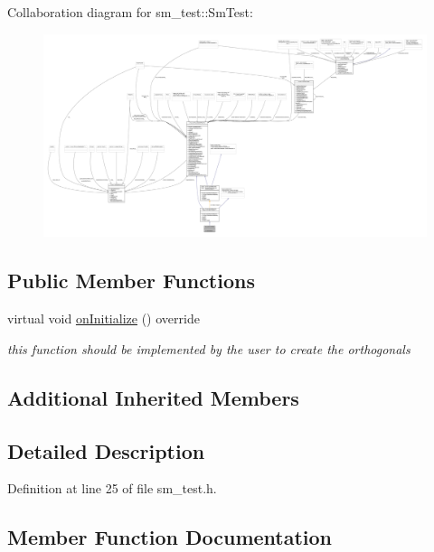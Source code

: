 Collaboration diagram for sm\+\_\+test\+:\+:Sm\+Test\+:
\nopagebreak
\begin{figure}[H]
\begin{center}
\leavevmode
\includegraphics[width=350pt]{structsm__test_1_1SmTest__coll__graph}
\end{center}
\end{figure}
\subsection*{Public Member Functions}
\begin{DoxyCompactItemize}
\item 
virtual void \hyperlink{structsm__test_1_1SmTest_afc961fbf2c09cd83a112875ba290795c}{on\+Initialize} () override
\begin{DoxyCompactList}\small\item\em this function should be implemented by the user to create the orthogonals \end{DoxyCompactList}\end{DoxyCompactItemize}
\subsection*{Additional Inherited Members}


\subsection{Detailed Description}


Definition at line 25 of file sm\+\_\+test.\+h.



\subsection{Member Function Documentation}
